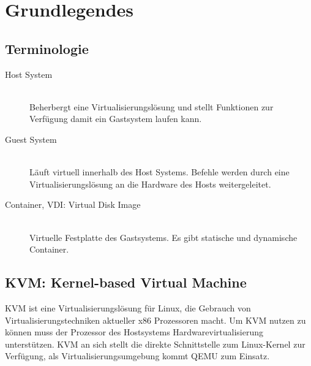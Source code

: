 

\newcommand{\SUBJECT}{Report}
\newcommand{\TITLE}{Cloud Infrastructre Lab 4}











\section{Grundlegendes}
\subsection{Terminologie}
\begin{description}
	\item[Host System] \hfill \\
	Beherbergt eine Virtualisierungslösung und stellt Funktionen zur Verfügung damit ein Gastsystem laufen kann.
	\item[Guest System] \hfill \\
	Läuft virtuell innerhalb des Host Systems. Befehle werden durch eine Virtualisierungslösung an die Hardware des Hosts weitergeleitet. 
	\item[Container, VDI: Virtual Disk Image] \hfill \\
	 Virtuelle Festplatte des Gastsystems. Es gibt statische und dynamische Container.
\end{description}

\subsection{KVM: Kernel-based Virtual Machine}
KVM ist eine Virtualisierungslösung für Linux, die Gebrauch von Virtualisierungstechniken aktueller x86 Prozessoren macht. Um KVM nutzen zu können muss der Prozessor des Hostsystems Hardwarevirtualisierung unterstützen. KVM an sich stellt die direkte Schnittstelle zum Linux-Kernel zur Verfügung, als Virtualisierungsumgebung kommt QEMU zum Einsatz.

